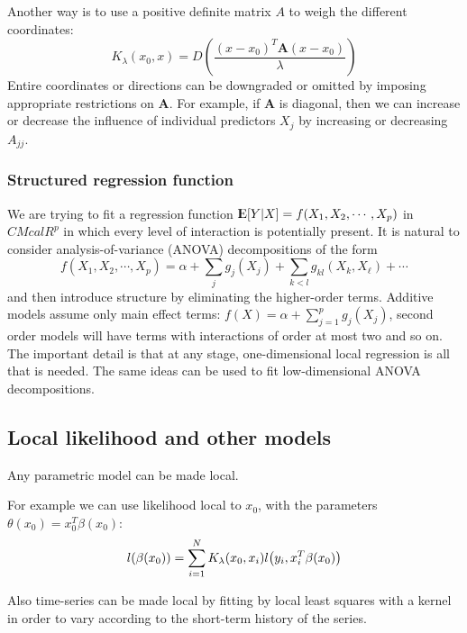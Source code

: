 Another way is to use a positive definite matrix $A$ to weigh the different coordinates:
\begin{equation}
K_\lambda(x_0, x) = D\left( \frac{(x-x_0)^T\mathbf{A}(x-x_0)}{\lambda}\right)
\end{equation}
Entire coordinates or directions can be downgraded or omitted by imposing appropriate restrictions on $\mathbf{A}$. For example, if $\mathbf{A}$ is diagonal, then we can increase or decrease the influence of individual predictors $X_j$ by increasing or decreasing $A_{jj}$.

\subsubsection{Structured regression function}
We are trying to fit a regression function ${\rm I\kern-.3em E}[Y|X] =f(X_1,X_2, \cdots, X_p)$ in $CMcal{R}^p$ in which every level of interaction is potentially present. It is natural to consider analysis-of-variance (ANOVA) decompositions of the form
\begin{equation}
f(X_1,X_2,\cdots, X_p) = \alpha + \sum_j g_j(X_j) +  \sum_{k<l} g_{kl}(X_k, X_\ell) + \cdots 
\end{equation}
and then introduce structure by eliminating the higher-order terms. Additive models assume only main effect terms: $f(X) = \alpha + \sum_{j=1}^p g_j(X_j)$, second order models will have terms with interactions of order at most two and so on.  The important detail is that at any stage, one-dimensional local regression is all that is needed. The same ideas can be used to fit low-dimensional ANOVA decompositions.

\subsection{Local likelihood and other models}
Any parametric model can be made local.

For example we can use likelihood local to $x_0$,  with the parameters $\theta(x_0) = x_0^T\beta(x_0)$:
\begin{equation}
l\br{\beta(x_0)} = \sum_{i=1}^N K_\lambda (x_0,x_i) l\br{y_i, x_i^T\beta(x_0)}
\end{equation}

Also time-series can be made local by fitting by local least squares with a kernel in order to vary according to the short-term history of the series.
